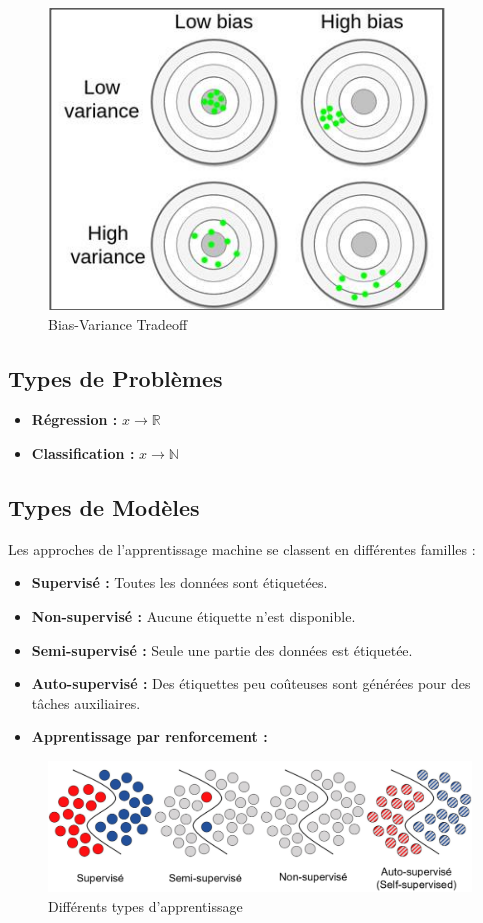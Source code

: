 \documentclass{article}
\begin{document}
\begin{figure}[ht]
    \centering
    \includegraphics[width=0.7\linewidth]{graphics/S2Intro/biais-variance.png}
    \caption{Bias-Variance Tradeoff}
    \label{fig:biais-variance}
\end{figure}

\subsection{Types de Problèmes}

\begin{itemize}
    \item \textbf{Régression :} \(x \xrightarrow{} \mathbb{R}\)
    \item \textbf{Classification :} \(x \xrightarrow{} \mathbb{N}\)
\end{itemize}

\subsection{Types de Modèles}
Les approches de l'apprentissage machine se classent en différentes familles :
\begin{itemize}
    \item \textbf{Supervisé :} Toutes les données sont étiquetées.
    \item \textbf{Non-supervisé :} Aucune étiquette n’est disponible.
    \item \textbf{Semi-supervisé :} Seule une partie des données est étiquetée.
    \item \textbf{Auto-supervisé :} Des étiquettes peu coûteuses sont générées pour des tâches auxiliaires.
    \item \textbf{Apprentissage par renforcement :}
\end{itemize}

\begin{figure}[ht]
    \centering
    \includegraphics[width=\linewidth]{graphics/S2Intro/learning_type.png}
    \caption{Différents types d’apprentissage}
    \label{fig:learning-types}
\end{figure}
\end{document}
